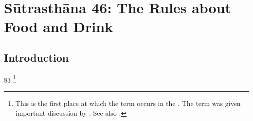 

\chapter{Sūtrasthāna 46: The Rules about Food and Drink}

\section{Introduction}

\begin{translation}
    \item \item[83] \label{dusivisa}%
    \footnote{This is the first place at which the term 
         occurs in the \SS. 
         The term  was given important discussion
         by \cite{meul-1992,meul-1991,meul-2011,meul}.  See also 
         \cite[548--550]{das-2003}.}
    \end{translation}